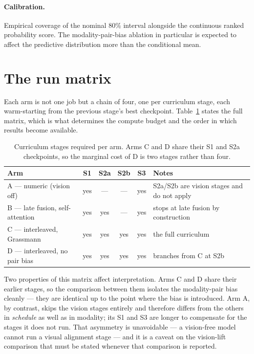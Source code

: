 \paragraph{Calibration.} Empirical coverage of the nominal 80\% interval alongside the
continuous ranked probability score. The modality-pair-bias ablation in particular is
expected to affect the predictive distribution more than the conditional mean.

\section{The run matrix}
\label{sec:run-matrix}

Each arm is not one job but a chain of four, one per curriculum stage, each warm-starting from
the previous stage's best checkpoint. Table~\ref{tab:runmatrix} states the full matrix, which
is what determines the compute budget and the order in which results become available.

\begin{table}[h!]
\centering
\small
\begin{tabular}{l c c c c l}
\hline
\textbf{Arm} & \textbf{S1} & \textbf{S2a} & \textbf{S2b} & \textbf{S3} & \textbf{Notes} \\
\hline
A --- numeric (vision off) & yes & --- & --- & yes & S2a/S2b are vision stages and do not
apply \\
B --- late fusion, self-attention & yes & yes & --- & yes & stops at late fusion by
construction \\
C --- interleaved, Grassmann & yes & yes & yes & yes & the full curriculum \\
D --- interleaved, no pair bias & yes & yes & yes & yes & branches from C at S2b \\
\hline
\end{tabular}
\caption{Curriculum stages required per arm. Arms C and D share their S1 and S2a
checkpoints, so the marginal cost of D is two stages rather than four.}
\label{tab:runmatrix}
\end{table}

Two properties of this matrix affect interpretation. Arms C and D share their earlier stages,
so the comparison between them isolates the modality-pair bias cleanly --- they are identical
up to the point where the bias is introduced. Arm A, by contrast, skips the vision stages
entirely and therefore differs from the others in \emph{schedule} as well as in modality; its
S1 and S3 are longer to compensate for the stages it does not run. That asymmetry is
unavoidable --- a vision-free model cannot run a visual alignment stage --- and it is a
caveat on the vision-lift comparison that must be stated whenever that comparison is reported.

